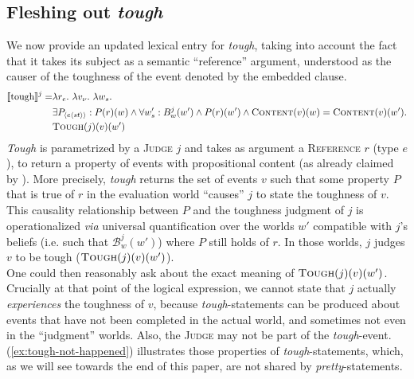 \documentclass[11pt]{article}
\begin{document}
\subsection{Fleshing out \textit{tough}}\label{sec:tough-def}
We now provide an updated lexical entry for \textit{tough}, taking into account the fact that it takes its subject as a semantic ``reference'' argument, understood as the causer of the toughness of the event denoted by the embedded clause.
\begin{align*}
	\llbracket\text{tough}\rrbracket^j = &\lambda r_e . \ \lambda v_\nu . \ \lambda w_s . \\
	&\exists P_{\langle e \langle st \rangle \rangle}: P(r)(w) \wedge \forall w'_s:  B^{j}_{w}(w') \wedge P(r)(w') \wedge \textsc{Content}(v)(w) = \textsc{Content}(v)(w').\\
	&\text{\textsc{Tough}}(j)(v)(w')
\end{align*}
\textit{Tough} is parametrized by a \textsc{Judge} $j$ and takes as argument a \textsc{Reference} $r$ (type $e$), to return a property of events with propositional content (as already claimed by \cite{Gluckman2021}). More precisely, \textit{tough} returns the set of events $v$ such that some property $P$ that is true of $r$ in the evaluation world ``causes'' $j$ to state the toughness of $v$. This causality relationship between $P$ and the toughness judgment of $j$ is operationalized \textit{via} universal quantification over the worlds $w'$ compatible with $j$'s beliefs (i.e. such that $\mathcal{B}^j_w(w')$) where $P$ still holds of $r$. In those worlds, $j$ judges $v$ to be tough ($\textsc{Tough}(j)(v)(w')$).\\

One could then reasonably ask about the exact meaning of $\textsc{Tough}(j)(v)(w')$. Crucially at that point of the logical expression, we cannot state that $j$ actually \textit{experiences} the toughness of $v$, because \textit{tough}-statements can be produced about events that have not been completed in the actual world, and sometimes not even in the ``judgment'' worlds. Also, the \textsc{Judge} may not be part of the \textit{tough}-event. (\ref{ex:tough-not-happened}) illustrates those properties of \textit{tough}-statements, which, as we will see towards the end of this paper, are not shared by \textit{pretty}-statements.
\begin{exe}
	\ex 
	\begin{xlist}
	\end{xlist}\label{ex:tough-not-happened}
\end{exe}
\end{document}
